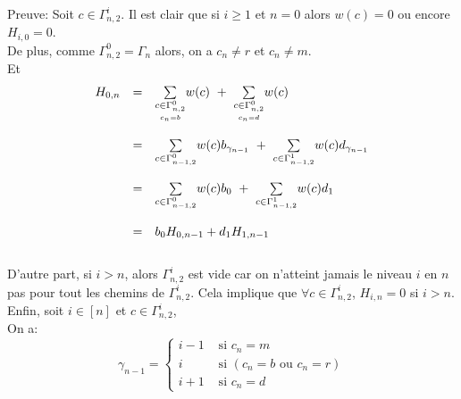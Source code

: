 Preuve:
Soit $c \in \Gamma_{n,2}^{i}$. Il est clair que si $i\geq 1$ et $n=0$ alors $w(c)=0$ ou encore $H_{i, 0}=0$. \\
De plus, comme $\Gamma_{n, 2}^{0}=\Gamma_{n}$ alors, on a $c_{n}\neq r$ et $c_{n}\neq m$.\vspace{5pt}\\
Et
\[
	\begin{array}{l l l}
		H_{0, n} & =       & \underset{\underset{c_{n}=b}{c\in \Gamma_{n,2}^{0}}}{\sum}w(c)
		\text{ }+\text{ }\underset{\underset{c_{n}=d}{c\in \Gamma_{n,2}^{0}}}{\sum}
		w(c)                                                                                        \\
		         & \text{} &                                                                        \\
		         & =       & \underset{c\in \Gamma_{n-1,2}^{0}}{\sum}w(c)b_{\gamma_{n-1}} \text{ }+
		\text{ }\underset{c\in \Gamma_{n-1,2}^{1}}{\sum}w(c)d_{\gamma_{n-1}}                        \\
		         & \text{} &                                                                        \\
		         & =       & \underset{c\in \Gamma_{n-1,2}^{0}}{\sum}w(c)b_{0} \text{ }+\text{ }
		\underset{c\in \Gamma_{n-1,2}^{1}}{\sum}w(c)d_{1}                                           \\
		         & \text{} &                                                                        \\
		         & =       & b_{0}H_{0,n-1}+d_{1}H_{1,n-1}
	\end{array}
\]\\D'autre part, si $i>n$, alors $\Gamma_{n,2}^{i}$ est vide car on n'atteint jamais le niveau $i$ en $n$ pas pour tout les chemins de $\Gamma_{n,2}^{i}$. Cela implique que $\forall c \in \Gamma_{n,2}^{i}$, $H_{i,n}=0$ si $i>n$.\vspace{10pt}\\ Enfin, soit $i \in [n]$ et $c \in \Gamma_{n,2}^{i}$, \\
On a:
$$
	\gamma_{n-1} = \begin{cases}
		i-1 & \text{ si }c_{n}=m                       \\
		i   & \text{ si }(c_{n}=b \text{ ou } c_{n}=r) \\
		i+1 & \text{ si }c_{n}=d
	\end{cases}
$$\\
